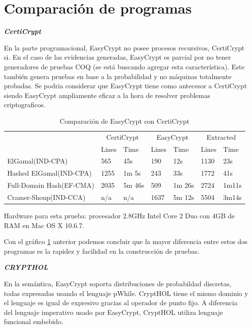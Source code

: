 \documentclass[runningheads,a4paper]{llncs}
\begin{document}
\section{Comparación de programas}
\centerline{\textbf{{\emph{CertiCrypt}}}}
En la parte programacional, EasyCrypt no posee procesos recursivos, CertiCrypt\cite{link3} si. En el caso de las evidencias generadas, EasyCrypt es parcial por no tener generadores de pruebas COQ (se está buscando agregar esta característica). Este también genera pruebas en base a la probabilidad y no máquinas totalmente probadas. Se podria considerar que EasyCrypt tiene como antecesor a CertiCrypt siendo EasyCrypt ampliamente eficaz a la hora de resolver problemas criptograficos.

\begin{table}
  \caption{Comparación de EasyCrypt con CertiCrypt}
  \label{tab:simple1}
  \centering
  \begin{tabular}{ |p{3.5cm}|p{1cm}|p{1.5cm}|p{1cm}|p{1.5cm}|p{1cm}|p{1.5cm}|  }
 \hline
 & \multicolumn{2}{|c|}{CertiCrypt} & \multicolumn{2}{|c|}{EasyCrypt} & \multicolumn{2}{|c|}{Extracted} \\\cline{2-7}

 &Lines&Time&Lines&Time&Lines&Time\\\cline{2-7}
 \hline
 ElGamal(IND-CPA) & 565 & 45s & 190 & 12s & 1130 & 23s\\
 Hashed ElGamal(IND-CPA) & 1255  & 1m 5s & 243  & 33s & 1772 & 41s\\
 Full-Domain Hash(EF-CMA) & 2035 & 5m 46s&  509 & 1m 26s & 2724 & 1m11s\\
 Cramer-Shoup(IND-CCA) & n/a & n/a & 1637 & 5m 12s & 5504 & 3m14s\\
 \hline
\end{tabular}
\end{table}

Hardware para esta prueba: procesador 2.8GHz Intel Core 2 Duo con 4GB de RAM en Mac OS X 10.6.7.\cite{article3}

Con el gráfico \ref{tab:simple1} anterior podemos concluir que la mayor diferencia entre estos dos programas es la rapidez y facilidad en la construcción de pruebas.

\centerline{\textbf{{\emph{CRYPTHOL}}}}

En la semántica, EasyCrypt soporta distribuciones de probabildad discretas, todas expresadas usando el lenguaje pWhile. CryptHOL\cite{link4} tiene el mismo dominio y el lenguaje es igual de expresivo gracias al operador de punto fijo. A diferencia del lenguaje imperativo usado por EasyCrypt, CryptHOL utiliza lenguaje funcional embebido.
\end{document}
